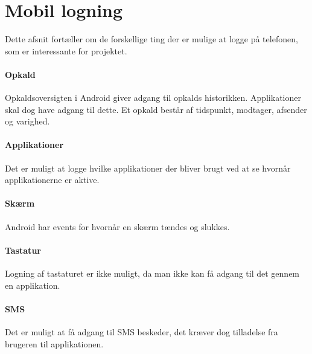 \section{Mobil logning}\label{logning}
Dette afsnit fortæller om de forskellige ting der er mulige at logge på telefonen, som er interessante for projektet.

\paragraph{Opkald}
Opkaldsoversigten i Android giver adgang til opkalds historikken.
Applikationer skal dog have adgang til dette.
Et opkald består af tidspunkt, modtager, afsender og varighed.

\paragraph{Applikationer}
Det er muligt at logge hvilke applikationer der bliver brugt ved at se hvornår applikationerne er aktive.

\paragraph{Skærm}
Android har events for hvornår en skærm tændes og slukkes.

\paragraph{Tastatur}
Logning af tastaturet er ikke muligt, da man ikke kan få adgang til det gennem en applikation.

\paragraph{SMS}
Det er muligt at få adgang til SMS beskeder, det kræver dog tilladelse fra brugeren til applikationen.